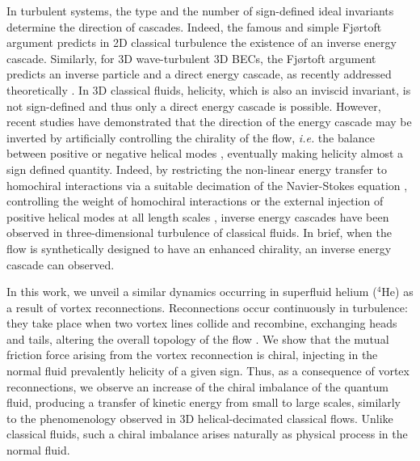 \documentclass[%
 reprint,
 amsmath,amssymb,
 aps,
 prl,
]{revtex4-2}
\begin{document}
{In turbulent systems, the type and the number of sign-defined ideal invariants determine the direction of cascades. Indeed, the famous and simple Fjørtoft argument \cite{fjortoft1953changes} predicts in 2D classical turbulence the existence of an inverse energy cascade. Similarly, for 3D wave-turbulent 3D BECs, the Fjørtoft argument predicts an inverse particle and a direct energy cascade, as recently addressed theoretically \cite{Zhu_DirectInverseCascades_2023}. In 3D classical fluids, helicity, which is also an inviscid invariant, is not sign-defined and thus only a direct energy cascade is possible. However, recent studies have demonstrated that the direction of the energy 
cascade may be inverted by artificially controlling the chirality of the 
flow, \textit{i.e.} the balance between positive or negative helical modes \cite{moffatt1969}, eventually making helicity almost a sign defined quantity. Indeed, by restricting the non-linear energy transfer to homochiral interactions via a suitable decimation of the Navier-Stokes equation 
\cite{biferaleInverseEnergyCascade2012a,biferale-etal-2013}, controlling the weight of homochiral interactions \cite{sahoo-etal-2017} or the external injection 
of positive helical modes at all length scales \cite{plunianInverseCascadeEnergy2020a}, inverse energy cascades have been observed in three-dimensional turbulence of classical fluids. In brief, when the flow is synthetically designed to have an enhanced chirality, an inverse energy cascade can observed.


In this work, we unveil a similar dynamics occurring in superfluid helium
($^4$He) as a result of vortex reconnections.  
Reconnections occur continuously in turbulence: they take place when
two vortex lines collide and recombine, exchanging heads and tails, 
altering the overall topology of the flow
\cite{koplik-levine-1993,bewley-etal-2008,rorai-etal-2016,serafini-etal-2017,galantucci-baggaley-parker-barenghi-2019,villoisUniversalNonuniversalAspects2017,villois2020irreversible}. 
We show that the mutual friction force arising from the  
vortex reconnection is chiral, injecting in the normal fluid prevalently 
helicity of a given sign. Thus, as a consequence of vortex reconnections,
we observe an increase of the chiral imbalance of the quantum fluid, producing a transfer of kinetic energy from small to large scales, similarly to the phenomenology observed in 3D helical-decimated classical flows. 
 Unlike classical fluids, such a chiral imbalance arises naturally as physical process in the normal fluid.%

}
\end{document}
